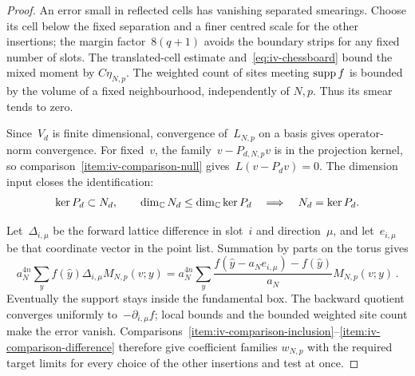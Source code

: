 \begin{proof}
An error small in reflected cells has vanishing separated smearings. Choose its cell below the fixed separation and a finer centred scale for the other insertions; the margin factor~$8(q+1)$ avoids the boundary strips for any fixed number of slots.
The translated-cell estimate and~\eqref{eq:iv-chessboard} bound the mixed moment by $C\eta_{N,p}$.
The weighted count of sites meeting $\operatorname{supp} f$ is bounded by the volume of a fixed neighbourhood, independently of $N,p$.
Thus its smear tends to zero.

Since~$V_d$ is finite dimensional, convergence of~$L_{N,p}$ on a basis gives operator-norm convergence. For fixed~$v$, the family~$v-P_{d,N,p}v$ is in the projection kernel, so comparison~\ref{item:iv-comparison-null} gives~$L(v-P_dv)=0$.
The dimension input closes the identification:
\begin{equation*}
 \ker P_d\subset N_d,\qquad \dim_\mathbb C N_d\le\dim_\mathbb C\ker P_d
 \quad\Longrightarrow\quad N_d=\ker P_d.
\end{equation*}

Let~$\Delta_{i,\mu}$ be the forward lattice difference in slot~$i$ and direction~$\mu$, and let~$e_{i,\mu}$ be that coordinate vector in the point list.
Summation by parts on the torus gives
\begin{equation*}
a_N^{4n}\sum_y f(\widehat y)\Delta_{i,\mu}M_{N,p}(v;y)
=a_N^{4n}\sum_y\frac{f(\widehat y-a_Ne_{i,\mu})-f(\widehat y)}{a_N}M_{N,p}(v;y)\,.
\end{equation*}
Eventually the support stays inside the fundamental box. The backward quotient converges uniformly to~$-\partial_{i,\mu}f$; local bounds and the bounded weighted site count make the error vanish.
Comparisons~\ref{item:iv-comparison-inclusion}--\ref{item:iv-comparison-difference} therefore give coefficient families $w_{N,p}$ with the required target limits for every choice of the other insertions and test at once.


\end{proof}

